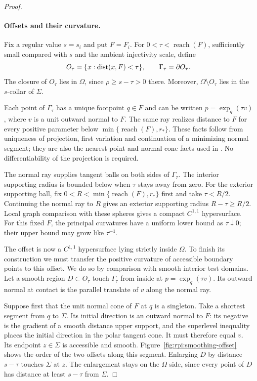 \begin{proof}
\paragraph{Offsets and their curvature.}
Fix a regular value $s=s_i$ and put $F=F_i$. For
$0<\tau<\operatorname{reach}(F)$, sufficiently small compared with
$s$ and the ambient injectivity scale, define
\[
 O_\tau=\{x:\operatorname{dist}(x,F)<\tau\},\qquad
 \Gamma_\tau=\partial O_\tau.
\]
The closure of $O_\tau$ lies in $\Omega$, since
$\rho\ge s-\tau>0$ there. Moreover,
$\Omega\setminus O_\tau$ lies in the $s$-collar of $\Sigma$.

Each point of $\Gamma_\tau$ has a unique footpoint $q\in F$ and
can be written $p=\exp_q(\tau v)$, where $v$ is a unit outward
normal to $F$. The same ray realizes distance to $F$ for every
positive parameter below $\min\{\operatorname{reach}(F),r_*\}$.
These facts follow from uniqueness of
projection, first variation and continuation of a minimizing normal
segment; they are also the nearest-point and normal-cone facts used
in \cite[Section~3.1]{BiZhuSmoothing2026}. No differentiability
of the projection is required.

The normal ray supplies tangent balls on both sides of
$\Gamma_\tau$. The interior supporting radius is bounded below
when $\tau$ stays away from zero. For the exterior supporting ball,
fix $0<R<\min\{\operatorname{reach}(F),r_*\}$ first and take
$\tau<R/2$. Continuing the normal ray to $R$ gives an exterior
supporting radius $R-\tau\ge R/2$. Local graph comparison with
these spheres gives a compact $C^{1,1}$ hypersurface.
For this fixed $F$, the principal curvatures have a uniform lower
bound as $\tau\downarrow0$; their upper bound may grow like
$\tau^{-1}$.

The offset is now a $C^{1,1}$ hypersurface lying strictly inside
$\Omega$. To finish its construction we must transfer the positive
curvature of accessible boundary points to this offset. We do so
by comparison with smooth interior test domains.
Let a smooth region $D\subset O_\tau$ touch $\Gamma_\tau$ from
inside at $p=\exp_q(\tau v)$. Its outward normal at contact is the
parallel translate of $v$ along the normal ray.

Suppose first that the unit normal cone of $F$ at $q$ is a singleton.
Take a shortest segment from $q$ to $\Sigma$. Its initial direction
is an outward normal to $F$: its negative is the gradient of a
smooth distance upper support, and the superlevel inequality places
the initial direction in the polar tangent cone. It must therefore
equal $v$. Its endpoint $z\in\Sigma$ is accessible and smooth.
Figure~\ref{fig:rpi:smoothing-offset} shows the order of the two
offsets along this segment.
Enlarging $D$ by distance $s-\tau$ touches $\Sigma$ at $z$. The
enlargement stays on the $\Omega$ side, since every point of $D$
has distance at least $s-\tau$ from $\Sigma$.


\end{proof}
